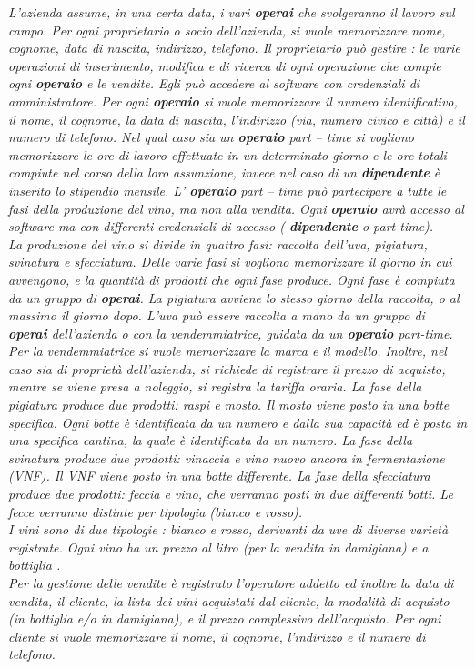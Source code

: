 \documentclass{article}
\begin{document}
\textit{L'azienda assume, in una certa data, i vari \textbf{operai} che svolgeranno il lavoro sul campo. Per ogni proprietario o socio dell'azienda, si vuole memorizzare nome, cognome, data di nascita, indirizzo, telefono.
Il proprietario può gestire : le varie operazioni di inserimento, modifica e di ricerca di ogni operazione che compie ogni \textbf{operaio} e le vendite. Egli può accedere al software con credenziali di amministratore.
Per ogni \textbf{operaio} si vuole memorizzare il numero identificativo, il nome, il cognome, la data di nascita, l'indirizzo (via, numero civico e città) e il numero di telefono.
Nel qual caso sia un \textbf{operaio} part – time si vogliono memorizzare le ore di lavoro effettuate in un determinato giorno e le ore totali compiute nel corso della loro assunzione, invece nel caso di un \textbf{dipendente} è inserito lo stipendio mensile.
L' \textbf{operaio} part – time può partecipare a tutte le fasi della produzione del vino, ma non alla vendita. 
Ogni \textbf{operaio} avrà accesso al software ma con differenti credenziali di accesso ( \textbf{dipendente} o part-time).\\\newline
La produzione del vino si divide in quattro fasi: raccolta dell'uva, pigiatura, svinatura e sfecciatura.
Delle varie fasi si vogliono memorizzare il giorno in cui avvengono, e la quantità di prodotti che ogni fase produce. Ogni fase è compiuta da un gruppo di \textbf{operai}. La pigiatura avviene lo stesso giorno della raccolta, o al massimo il giorno dopo.
L’uva può essere raccolta a mano da un gruppo di \textbf{operai} dell'azienda o con la vendemmiatrice, guidata da un \textbf{operaio} part-time.
Per la vendemmiatrice si vuole memorizzare la marca e il modello. Inoltre, nel caso sia di proprietà dell'azienda, si richiede di registrare il prezzo di acquisto, mentre se viene presa a noleggio, si registra la tariffa oraria.
La fase della pigiatura produce due prodotti: raspi e mosto. Il mosto viene posto in una botte specifica.
Ogni botte è identificata da un numero e dalla sua capacità ed è posta in una specifica cantina, la quale è identificata da un numero.
La fase della svinatura produce due prodotti: vinaccia e vino nuovo ancora in fermentazione (VNF). Il VNF viene posto in una botte differente. 
La fase della sfecciatura produce due prodotti: feccia e vino, che verranno posti in due differenti botti. Le fecce verranno distinte per tipologia (bianco e rosso).\\
I vini sono di due tipologie : bianco e rosso, derivanti da uve di diverse varietà registrate. Ogni vino ha un prezzo al litro (per la vendita in damigiana) e a bottiglia .\\\newline
Per la gestione delle vendite è registrato l'operatore addetto ed inoltre la data di vendita, il cliente, la lista dei vini acquistati dal cliente, la modalità di acquisto (in bottiglia e/o in damigiana), e il prezzo complessivo dell'acquisto. Per ogni cliente si vuole memorizzare il nome, il cognome, l'indirizzo e il numero di telefono.}
\newpage
\newpage
\end{document}
